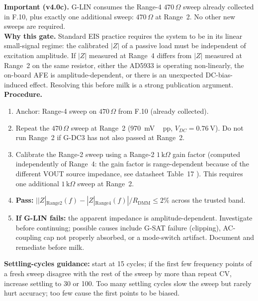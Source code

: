 \documentclass[11pt,a4paper]{article}
\newcommand{\kohm}[1]{\ensuremath{#1\,\mathrm{k}\Omega}}
\newcommand{\Rohm}[1]{\ensuremath{#1\,\Omega}}
\begin{document}
\begin{gatebox}
\textbf{Important (v4.0c).} G-LIN consumes the Range-4 \Rohm{470} sweep already collected in F.10, plus exactly one additional sweep: \Rohm{470} at Range~2. No other new sweeps are required.
\\[2pt]
\textbf{Why this gate.} Standard EIS practice requires the system to be in its linear small-signal regime: the calibrated $|Z|$ of a passive load must be independent of excitation amplitude. If $|Z|$ measured at Range~4 differs from $|Z|$ measured at Range~2 on the same resistor, either the AD5933 is operating non-linearly, the on-board AFE is amplitude-dependent, or there is an unexpected DC-bias-induced effect. Resolving this before milk is a strong publication argument.
\\[2pt]
\textbf{Procedure.}
\begin{enumerate}
\item Anchor: Range-4 sweep on \Rohm{470} from F.10 (already collected).
\item Repeat the \Rohm{470} sweep at Range~2 (\SI{970}{\milli\volt\,pp}, $V_{DC}=\SI{0.76}{\volt}$). Do not run Range~2 if G-DC3 has not also passed at Range~2.
\item Calibrate the Range-2 sweep using a Range-2 \kohm{1} gain factor (computed independently of Range~4: the gain factor is range-dependent because of the different VOUT source impedance, see datasheet Table~17 \cite{ad5933ds}). This requires one additional \kohm{1} sweep at Range~2.
\item \textbf{Pass:} $||Z|_\mathrm{Range2}(f) - |Z|_\mathrm{Range4}(f)| / R_\mathrm{DMM} \leq 2\%$ across the trusted band.
\item \textbf{If G-LIN fails:} the apparent impedance is amplitude-dependent. Investigate before continuing; possible causes include G-SAT failure (clipping), AC-coupling cap not properly absorbed, or a mode-switch artifact. Document and remediate before milk.
\end{enumerate}
\end{gatebox}

\begin{openbox}
\textbf{Settling-cycles guidance:} start at 15 cycles; if the first few frequency points of a fresh sweep disagree with the rest of the sweep by more than repeat CV, increase settling to 30 or 100. Too many settling cycles slow the sweep but rarely hurt accuracy; too few cause the first points to be biased.
\end{openbox}
\end{document}
